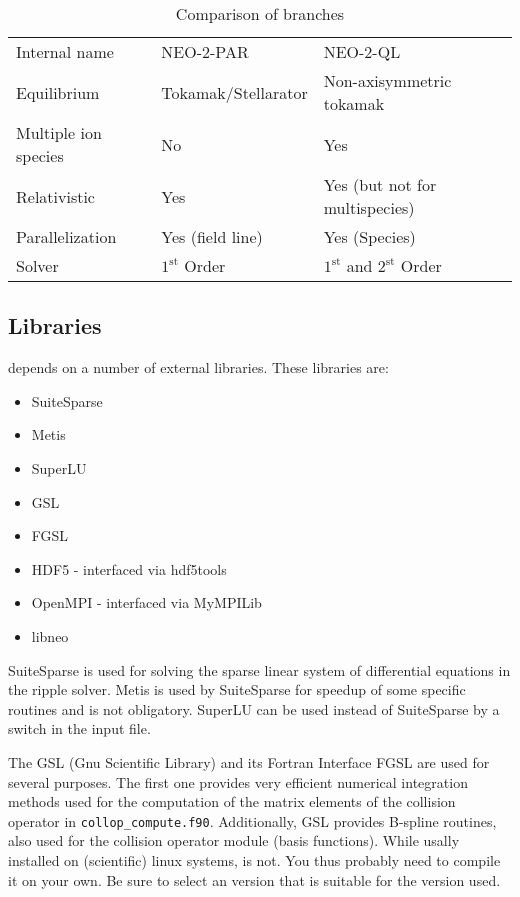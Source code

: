 \documentclass{article}
\newcommand{\vv}[1]{\texttt{\detokenize{#1}}}
\begin{document}
\begin{table}[h]
\centering
\begin{tabular}{lll}
Internal name   & NEO-2-PAR & NEO-2-QL\\
Equilibrium     & Tokamak/Stellarator & Non-axisymmetric tokamak\\
Multiple ion species & No & Yes\\
Relativistic    & Yes & Yes (but not for multispecies)\\
Parallelization & Yes (field line) & Yes (Species)\\
Solver          & $1^\mathrm{st}$ Order & $1^\mathrm{st}$ and $2^\mathrm{st}$ Order%
\end{tabular}
\caption{Comparison of \vv{NEO-2} branches}
\label{tab:neo2branches}
\end{table}

\subsection{Libraries\label{technicalbackground_libraries}}
\vv{NEO-2} depends on a number of external libraries. These libraries
are:
\begin{itemize}
\item SuiteSparse
\item Metis
\item SuperLU
\item GSL
\item FGSL
\item HDF5 - interfaced via hdf5tools
\item OpenMPI - interfaced via MyMPILib
\item libneo
\end{itemize}

SuiteSparse is used for solving the sparse linear system of differential
equations in the ripple solver. Metis is used by SuiteSparse for speedup
of some specific routines and is not obligatory. SuperLU can be used
instead of SuiteSparse by a switch in the input file.

The GSL (Gnu Scientific Library) and its Fortran Interface FGSL are used
for several purposes. The first one provides very efficient numerical
integration methods used for the computation of the matrix elements of
the collision operator in \verb|collop_compute.f90|. Additionally, GSL
provides B-spline routines, also used for the collision operator module
(basis functions). While \vv{gsl} usally installed on (scientific) linux
systems, \vv{fgsl} is not. You thus probably need to compile it on your
own. Be sure to select an \vv{fgsl} version that is suitable for the
\vv{gsl} version used.
\end{document}
